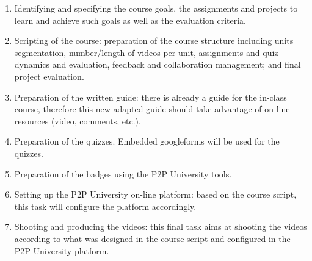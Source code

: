 \documentclass{tufte-book} %
\begin{document}
\begin{enumerate}
    \item Identifying and specifying the course goals, the assignments and projects to learn and achieve such goals as well as the evaluation criteria.
	\item Scripting of the course: preparation of the course structure including units segmentation, number/length of videos per unit, assignments and quiz dynamics and evaluation, feedback and collaboration management; and final project evaluation.
	\item Preparation of the written guide: there is already a guide for the in-class course, therefore this new adapted guide should take advantage of on-line resources (video, comments, etc.).
    \item Preparation of the quizzes. 
    Embedded googleforms will be used for the quizzes.
    \item Preparation of the badges using the P2P University tools.
	\item Setting up the P2P University on-line platform: based on the course script, this task will configure the platform accordingly.
	\item Shooting and producing the videos: this final task aims at shooting the videos according to what was designed in the course script and configured in the P2P University platform.
\end{enumerate}


\end{document}
